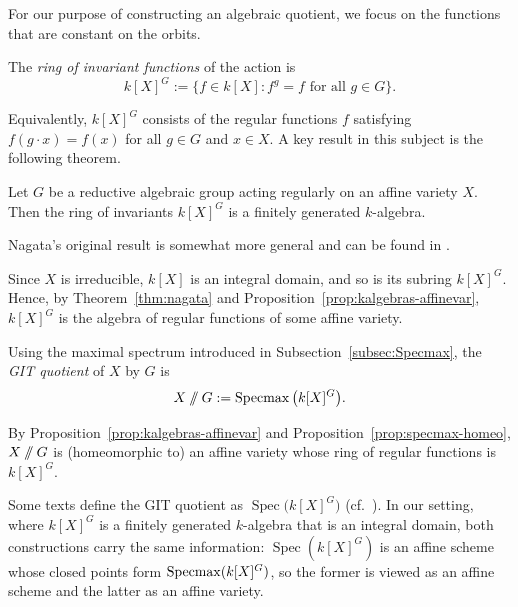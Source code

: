 For our purpose of constructing an algebraic quotient, we focus on the functions that are constant on the orbits.

\begin{definition}
    The \emph{ring of invariant functions} of the action is
    \[
        k[X]^G := \{ f \in k[X] : f^g = f \text{ for all } g \in G \}.
    \]
\end{definition}

Equivalently, $k[X]^G$ consists of the regular functions $f$ satisfying $f(g \cdot x) = f(x)$ for all $g \in G$ and $x \in X$. A key result in this subject is the following theorem.

\begin{theorem}[Nagata]\label{thm:nagata}
    Let $G$ be a reductive algebraic group acting regularly on an affine variety $X$. Then the ring of invariants $k[X]^G$ is a finitely generated $k$-algebra.
\end{theorem}

Nagata's original result is somewhat more general and can be found in \cite{nagataInvariantsGroupAffine1963}.

Since $X$ is irreducible, $k[X]$ is an integral domain, and so is its subring $k[X]^G$. Hence, by Theorem~\ref{thm:nagata} and Proposition~\ref{prop:kalgebras-affinevar}, $k[X]^G$ is the algebra of regular functions of some affine variety.

\begin{definition}\label{def:git-quotient}
    Using the maximal spectrum introduced in Subsection~\ref{subsec:Specmax}, the \emph{GIT quotient} of $X$ by $G$ is
    \[
        X \git G := \Specmax\big(k[X]^G\big).
    \]
\end{definition}

By Proposition~\ref{prop:kalgebras-affinevar} and Proposition~\ref{prop:specmax-homeo}, $X \git G$ is (homeomorphic to) an affine variety whose ring of regular functions is $k[X]^G$.

Some texts define the GIT quotient as $\operatorname{Spec}\big(k[X]^G\big)$ (cf.\ \cite{zamorasaizGeometricInvariantTheory2021, maret_note_nodate, casimiroCharacterVarietiesTheir2026}). In our setting, where $k[X]^G$ is a finitely generated $k$-algebra that is an integral domain, both constructions carry the same information: $\operatorname{Spec}(k[X]^G)$ is an affine scheme whose closed points form $\operatorname{Specmax}(k[X]^G)$, so the former is viewed as an affine scheme and the latter as an affine variety.


